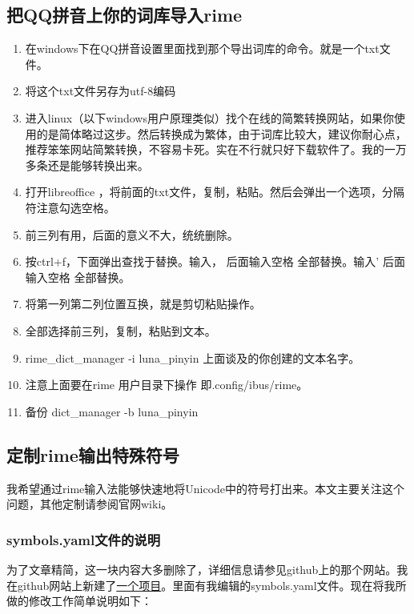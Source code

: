 \documentclass[12pt,oneside]{book}
\begin{document}
\begin{common-format}
\subsection{把QQ拼音上你的词库导入rime}
\begin{enumerate}
\item 在windows下在QQ拼音设置里面找到那个导出词库的命令。就是一个txt文件。
\item 将这个txt文件另存为utf-8编码
\item 进入linux（以下windows用户原理类似）找个在线的简繁转换网站，如果你使用的是简体略过这步。然后转换成为繁体，由于词库比较大，建议你耐心点，推荐笨笨网站简繁转换，不容易卡死。实在不行就只好下载软件了。我的一万多条还是能够转换出来。
\item 打开libreoffice ，将前面的txt文件，复制，粘贴。然后会弹出一个选项，分隔符注意勾选空格。
\item 前三列有用，后面的意义不大，统统删除。
\item 按ctrl+f，下面弹出查找于替换。输入，  后面输入空格   全部替换。输入'     后面输入空格   全部替换。
\item 将第一列第二列位置互换，就是剪切粘贴操作。
\item 全部选择前三列，复制，粘贴到文本。
\item rime\_dict\_manager  -i luna\_pinyin   上面谈及的你创建的文本名字。
\item 注意上面要在rime 用户目录下操作  即.config/ibus/rime。
\item 备份   dict\_manager -b luna\_pinyin  
\end{enumerate}


\subsection{定制rime输出特殊符号}
\begin{flushright}
\begin{notecard}[olive!30]{15em}
我希望通过rime输入法能够快速地将Unicode中的符号打出来。本文主要关注这个问题，其他定制请参阅官网wiki。
\end{notecard}
\end{flushright}

\subsubsection{symbols.yaml文件的说明}
为了文章精简，这一块内容大多删除了，详细信息请参见github上的那个网站。我在github网站上新建了\href{https://github.com/a358003542/rime-symbols-yaml}{一个项目}。里面有我编辑的symbols.yaml文件。现在将我所做的修改工作简单说明如下：


\end{common-format}
\end{document}
